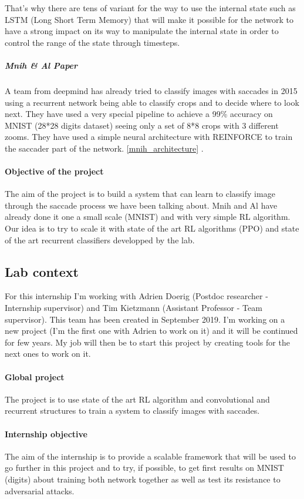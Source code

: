 \documentclass[11pt]{article}
\begin{document}
That's why there are tens of variant for the way to use the internal state such as LSTM (Long Short Term Memory) that will make it possible for the network to have a strong impact on its way to manipulate the internal state in order to control the range of the state through timesteps.
\subparagraph{Mnih \& Al Paper}
A team from deepmind has already tried to classify images with saccades in 2015 using a recurrent network being able to classify crops and to decide where to look next. They have used a very special pipeline to achieve a 99\% accuracy on MNIST (28*28 digits dataset) seeing only a set of 8*8 crops with 3 different zooms. They have used a simple neural architecture with REINFORCE to train the saccader part of the network. \ref{mnih_architecture} \cite{mnih}.
\paragraph{Objective of the project}
The aim of the project is to build a system that can learn to classify image through the saccade process we have been talking about. Mnih and Al have already done it one a small scale (MNIST) and with very simple RL algorithm. Our idea is to try to scale it with state of the art RL algorithms (PPO) and state of the art recurrent classifiers developped by the lab.
\subsection{Lab context}
For this internship I'm working with Adrien Doerig (Postdoc researcher - Internship supervisor) and Tim Kietzmann (Assistant Professor - Team supervisor). This team has been created in September 2019.
I'm working on a new project (I'm the first one with Adrien to work on it) and it will be continued for few years. My job will then be to start this project by creating tools for the next ones to work on it.
\paragraph{Global project}
The project is to use state of the art RL algorithm and convolutional and recurrent structures to train a system to classify images with saccades.
\paragraph{Internship objective}
The aim of the internship is to provide a scalable framework that will be used to go further in this project and to try, if possible, to get first results on MNIST (digits) about training both network together as well as test its resistance to adversarial attacks.
\end{document}
